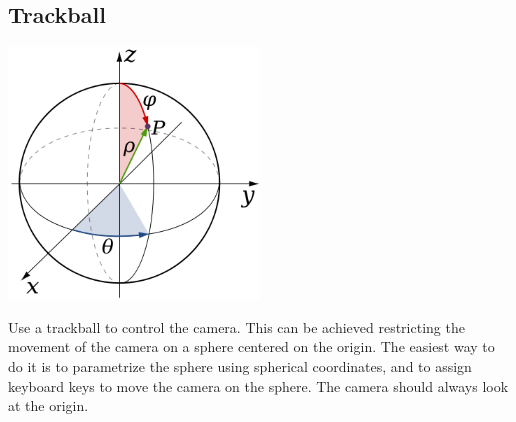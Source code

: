 \documentclass[11pt]{article}
\begin{document}
\subsection{Trackball}

  \begin{center}
    \includegraphics[width=0.5\textwidth]{trackball}
  \end{center}
Use a trackball to control the camera. This can be achieved restricting the movement of the camera on a sphere centered on the origin. The easiest way to do it is to parametrize the sphere using spherical coordinates, and to assign keyboard keys to move the camera on the sphere. The camera should always look at the origin.




%
%
\end{document}
